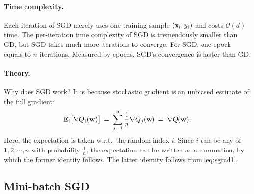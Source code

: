 \documentclass[11pt]{article}
\numberwithin{equation}{section}
\def\w{{\bf w}}
\def\x{{\bf x}}
\def\OM{{\mathcal O}}
\def\EB{{\mathbb E}}
\begin{document}
\paragraph{Time complexity.}
Each iteration of SGD merely uses one training sample $(\x_i, y_i)$ and costs $\OM (d)$ time.
The per-iteration time complexity of SGD is tremendously smaller than GD, 
but SGD takes much more iterations to converge.
For SGD, one epoch equals to $n$ iterations.
Measured by epochs, SGD's convergence is faster than GD.


\paragraph{Theory.}
Why does SGD work?
It is because stochastic gradient is an unbiased estimate of the full gradient:
\begin{eqnarray*}
\EB_{i} \big[ \nabla Q_i (\w ) \big]
\: = \: \sum_{j=1}^n \frac{1}{n}  \nabla Q_j (\w ) 
\: = \: \nabla Q (\w) .
\end{eqnarray*}
Here, the expectation is taken w.r.t.\ the random index $i$.
Since $i$ can be any of $1, 2, \cdots , n$ with probability $\frac{1}{n}$,
the expectation can be written as a summation, by which the former identity follows.
The latter identity follows from \eqref{eq:sgrad1}.







\subsection{Mini-batch SGD}
\end{document}

